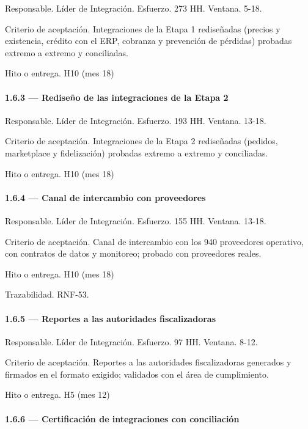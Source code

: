 \documentclass[11pt]{article}
\begin{document}
Responsable. Líder de Integración. Esfuerzo. 273 HH. Ventana. 5-18.

Criterio de aceptación. Integraciones de la Etapa 1 rediseñadas (precios y existencia, crédito con el ERP, cobranza y prevención de pérdidas) probadas extremo a extremo y conciliadas.

Hito o entrega. H10 (mes 18)

\paragraph{1.6.3 — Rediseño de las integraciones de la Etapa 2}

Responsable. Líder de Integración. Esfuerzo. 193 HH. Ventana. 13-18.

Criterio de aceptación. Integraciones de la Etapa 2 rediseñadas (pedidos, marketplace y fidelización) probadas extremo a extremo y conciliadas.

Hito o entrega. H10 (mes 18)

\paragraph{1.6.4 — Canal de intercambio con proveedores}

Responsable. Líder de Integración. Esfuerzo. 155 HH. Ventana. 13-18.

Criterio de aceptación. Canal de intercambio con los 940 proveedores operativo, con contratos de datos y monitoreo; probado con proveedores reales.

Hito o entrega. H10 (mes 18)

Trazabilidad. RNF-53.

\paragraph{1.6.5 — Reportes a las autoridades fiscalizadoras}

Responsable. Líder de Integración. Esfuerzo. 97 HH. Ventana. 8-12.

Criterio de aceptación. Reportes a las autoridades fiscalizadoras generados y firmados en el formato exigido; validados con el área de cumplimiento.

Hito o entrega. H5 (mes 12)

\paragraph{1.6.6 — Certificación de integraciones con conciliación}
\end{document}
